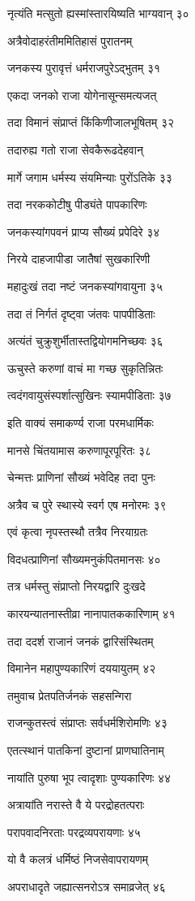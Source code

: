 नृत्यंति मत्सुतो ह्यस्मांस्तारयिष्यति भाग्यवान् ३०

अत्रैवोदाहरंतीममितिहासं पुरातनम्

जनकस्य पुरावृत्तं धर्मराजपुरेऽद्भुतम् ३१

एकदा जनको राजा योगेनासून्समत्यजत्

तदा विमानं संप्राप्तं किंकिणीजालभूषितम् ३२

तदारुह्य गतो राजा सेवकैरूढदेहवान्

मार्गे जगाम धर्मस्य संयमिन्याः पुरोंऽतिके ३३

तदा नरककोटीषु पीड्यंते पापकारिणः

जनकस्यांगपवनं प्राप्य सौख्यं प्रपेदिरे ३४

निरये दाहजापीडा जातैषां सुखकारिणी

महादुःखं तदा नष्टं जनकस्यांगवायुना ३५

तदा तं निर्गतं दृष्ट्वा जंतवः पापपीडिताः

अत्यंतं चुक्रुशुर्भीतास्तद्वियोगमनिच्छवः ३६

ऊचुस्ते करुणां वाचं मा गच्छ सुकृतिन्नितः

त्वदंगवायुसंस्पर्शात्सुखिनः स्यामपीडिताः ३७

इति वाक्यं समाकर्ण्य राजा परमधार्मिकः

मानसे चिंतयामास करुणापूरपूरितः ३८

चेन्मत्तः प्राणिनां सौख्यं भवेदिह तदा पुनः

अत्रैव च पुरे स्थास्ये स्वर्ग एष मनोरमः ३९

एवं कृत्वा नृपस्तस्थौ तत्रैव निरयाग्रतः

विदधत्प्राणिनां सौख्यमनुकंपितमानसः ४०

तत्र धर्मस्तु संप्राप्तो निरयद्वारि दुःखदे

कारयन्यातनास्तीव्रा नानापातककारिणाम् ४१

तदा ददर्श राजानं जनकं द्वारिसंस्थितम्

विमानेन महापुण्यकारिणं दययायुतम् ४२

तमुवाच प्रेतपतिर्जनकं सहसन्गिरा

राजन्कुतस्त्वं संप्राप्तः सर्वधर्मशिरोमणिः ४३

एतत्स्थानं पातकिनां दुष्टानां प्राणघातिनाम्

नायांति पुरुषा भूप त्वादृशाः पुण्यकारिणः ४४

अत्रायांति नरास्ते वै ये परद्रोहतत्पराः

परापवादनिरताः परद्रव्यपरायणाः ४५

यो वै कलत्रं धर्मिष्ठं निजसेवापरायणम्

अपराधादृते जह्यात्सनरोऽत्र समाव्रजेत् ४६

